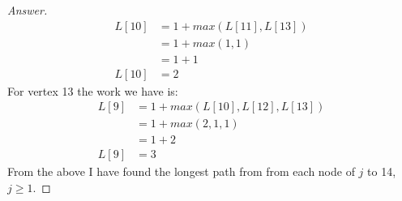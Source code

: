 \documentclass[11pt]{article}
\theoremstyle{definition}
\theoremstyle{definition}
\theoremstyle{definition}
\begin{document}
\begin{proof}[Answer]
\begin{align*}
L[10] &= 1 + max(L[11], L[13]) \\
&= 1 + max(1, 1) \\
&= 1 + 1 \\
L[10] &= 2
\end{align*}
For vertex 13 the work we have is: \\
\begin{align*}
L[9] &= 1 + max(L[10], L[12], L[13]) \\
&= 1 + max(2, 1, 1) \\
&= 1 + 2 \\
L[9] &= 3
\end{align*}
From the above I have found the longest path from from each node of $j$ to 14, $j \geq 1$. 
\end{proof}

\end{document}
